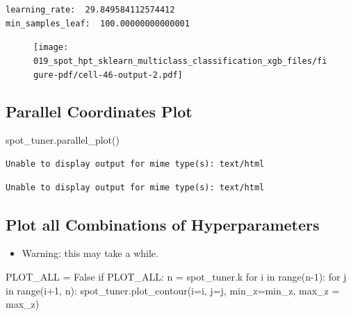 \documentclass[
  letterpaper,
  DIV=11,
  numbers=noendperiod]{scrreprt}
\newenvironment{Shaded}{\begin{snugshade}}{\end{snugshade}}
\newcommand{\BuiltInTok}[1]{\textcolor[rgb]{0.00,0.23,0.31}{#1}}
\newcommand{\ControlFlowTok}[1]{\textcolor[rgb]{0.00,0.23,0.31}{#1}}
\newcommand{\DecValTok}[1]{\textcolor[rgb]{0.68,0.00,0.00}{#1}}
\newcommand{\KeywordTok}[1]{\textcolor[rgb]{0.00,0.23,0.31}{#1}}
\newcommand{\NormalTok}[1]{\textcolor[rgb]{0.00,0.23,0.31}{#1}}
\newcommand{\OperatorTok}[1]{\textcolor[rgb]{0.37,0.37,0.37}{#1}}
\newcommand{\VariableTok}[1]{\textcolor[rgb]{0.07,0.07,0.07}{#1}}
\providecommand{\tightlist}{%
  \setlength{\itemsep}{0pt}\setlength{\parskip}{0pt}}\usepackage{longtable,booktabs,array}
\begin{document}
\begin{verbatim}
learning_rate:  29.849584112574412
min_samples_leaf:  100.00000000000001
\end{verbatim}

\begin{figure}[H]

{\centering \texttt{[image: 019\_spot\_hpt\_sklearn\_multiclass\_classification\_xgb\_files/figure-pdf/cell-46-output-2.pdf]}

}

\end{figure}

\hypertarget{parallel-coordinates-plot-2}{%
\subsection{Parallel Coordinates
Plot}\label{parallel-coordinates-plot-2}}

\begin{Shaded}
\begin{Highlighting}[]
\NormalTok{spot\_tuner.parallel\_plot()}
\end{Highlighting}
\end{Shaded}

\begin{verbatim}
Unable to display output for mime type(s): text/html
\end{verbatim}

\begin{verbatim}
Unable to display output for mime type(s): text/html
\end{verbatim}

\hypertarget{plot-all-combinations-of-hyperparameters-2}{%
\subsection{Plot all Combinations of
Hyperparameters}\label{plot-all-combinations-of-hyperparameters-2}}

\begin{itemize}
\tightlist
\item
  Warning: this may take a while.
\end{itemize}

\begin{Shaded}
\begin{Highlighting}[]
\NormalTok{PLOT\_ALL }\OperatorTok{=} \VariableTok{False}
\ControlFlowTok{if}\NormalTok{ PLOT\_ALL:}
\NormalTok{    n }\OperatorTok{=}\NormalTok{ spot\_tuner.k}
    \ControlFlowTok{for}\NormalTok{ i }\KeywordTok{in} \BuiltInTok{range}\NormalTok{(n}\OperatorTok{{-}}\DecValTok{1}\NormalTok{):}
        \ControlFlowTok{for}\NormalTok{ j }\KeywordTok{in} \BuiltInTok{range}\NormalTok{(i}\OperatorTok{+}\DecValTok{1}\NormalTok{, n):}
\NormalTok{            spot\_tuner.plot\_contour(i}\OperatorTok{=}\NormalTok{i, j}\OperatorTok{=}\NormalTok{j, min\_z}\OperatorTok{=}\NormalTok{min\_z, max\_z }\OperatorTok{=}\NormalTok{ max\_z)}
\end{Highlighting}
\end{Shaded}
\end{document}
